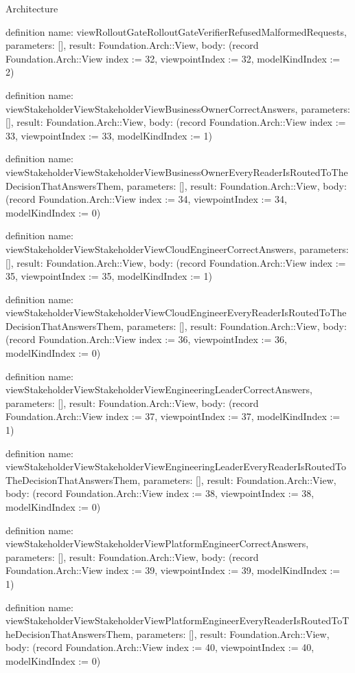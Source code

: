 \begin{lexlean}{Architecture}
\begin{semanticmodule}
definition{
  name: viewRolloutGateRolloutGateVerifierRefusedMalformedRequests,
  parameters: [],
  result: Foundation.Arch::View,
  body: (record Foundation.Arch::View {index := 32, viewpointIndex := 32, modelKindIndex := 2})
}

definition{
  name: viewStakeholderViewStakeholderViewBusinessOwnerCorrectAnswers,
  parameters: [],
  result: Foundation.Arch::View,
  body: (record Foundation.Arch::View {index := 33, viewpointIndex := 33, modelKindIndex := 1})
}

definition{
  name: viewStakeholderViewStakeholderViewBusinessOwnerEveryReaderIsRoutedToTheDecisionThatAnswersThem,
  parameters: [],
  result: Foundation.Arch::View,
  body: (record Foundation.Arch::View {index := 34, viewpointIndex := 34, modelKindIndex := 0})
}

definition{
  name: viewStakeholderViewStakeholderViewCloudEngineerCorrectAnswers,
  parameters: [],
  result: Foundation.Arch::View,
  body: (record Foundation.Arch::View {index := 35, viewpointIndex := 35, modelKindIndex := 1})
}

definition{
  name: viewStakeholderViewStakeholderViewCloudEngineerEveryReaderIsRoutedToTheDecisionThatAnswersThem,
  parameters: [],
  result: Foundation.Arch::View,
  body: (record Foundation.Arch::View {index := 36, viewpointIndex := 36, modelKindIndex := 0})
}

definition{
  name: viewStakeholderViewStakeholderViewEngineeringLeaderCorrectAnswers,
  parameters: [],
  result: Foundation.Arch::View,
  body: (record Foundation.Arch::View {index := 37, viewpointIndex := 37, modelKindIndex := 1})
}

definition{
  name: viewStakeholderViewStakeholderViewEngineeringLeaderEveryReaderIsRoutedToTheDecisionThatAnswersThem,
  parameters: [],
  result: Foundation.Arch::View,
  body: (record Foundation.Arch::View {index := 38, viewpointIndex := 38, modelKindIndex := 0})
}

definition{
  name: viewStakeholderViewStakeholderViewPlatformEngineerCorrectAnswers,
  parameters: [],
  result: Foundation.Arch::View,
  body: (record Foundation.Arch::View {index := 39, viewpointIndex := 39, modelKindIndex := 1})
}

definition{
  name: viewStakeholderViewStakeholderViewPlatformEngineerEveryReaderIsRoutedToTheDecisionThatAnswersThem,
  parameters: [],
  result: Foundation.Arch::View,
  body: (record Foundation.Arch::View {index := 40, viewpointIndex := 40, modelKindIndex := 0})
}


\end{semanticmodule}
\end{lexlean}
